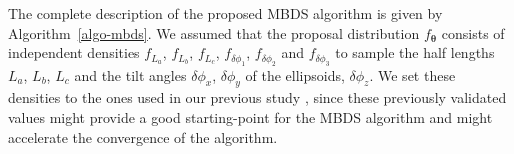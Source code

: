 \documentclass[journal]{IEEEtran}
\begin{document}





The complete description of the proposed MBDS algorithm is given by
Algorithm~\ref{algo-mbds}. We assumed that the proposal distribution
$f_{\boldsymbol{\theta}}$ consists of independent densities $f_{L_a}$,
$f_{L_b}$, $f_{L_c}$, $f_{\delta{\phi_1}}$, $f_{\delta{\phi_2}}$ and
$f_{\delta{\phi_3}}$ to sample the half lengths $L_a$, $L_b$, $L_c$
and the tilt angles $\delta{\phi_x}$, $\delta{\phi_y}$ of the
ellipsoids, $\delta{\phi_z}$. We set these densities to the ones used
in our previous study \cite{li2016novel}, since these previously
validated values might provide a good starting-point for the MBDS
algorithm and might accelerate the convergence of the algorithm.
\end{document}
